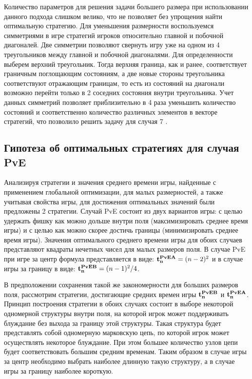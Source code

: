 Количество параметров для решения задачи большего размера при использовании данного подхода слишком велико, что не позволяет без упрощения найти оптимальную стратегию.
Для уменьшения размерности воспользуемся симметриями в игре стратегий игроков относительно главной и побочной диагоналей. 
Две симметрии позволяют свернуть игру уже на одном из 4 треугольников между главной и побочной диагоналями. 
Для определенности выберем верхний треугольник. Тогда верхняя граница, как и ранее, соответствует граничным поглощающим состояниям,
а две новые стороны треугольника соответствуют отражающим границам, то есть из состояний на диагонали возможно перейти только в 2 соседних состояния внутри треугольника.
Учет данных симметрий позволяет приблизительно в 4 раза уменьшить количество состояний и соответственно количество различных элементов в векторе стратегий,
что позволило решить задачу для случая 7 . 

\subsection{Гипотеза об оптимальных стратегиях для случая PvE}\label{subsec:ch3/sec1/sub1}

Анализируя стратегии и значения среднего времени игры, найденные с применением глобальной оптимизации, для малых размерностей,
а также учитывая свойства игры, для достижения оптимальных значений были предложены 2 стратегии.
Случай PvE состоит из двух вариантов игры: с целью удержать фишку как можно дольше внутри поля (максимизировать среднее время игры)
и с целью как можно скорее достичь границы (минимизировать среднее время игры). 
Значения оптимального среднего времени игры для обоих случаев представляют квадраты нечетных чисел для малых размеров поля.
В случае PvE при игре за центр формула представляется в виде: ${\bf t_n^{PvE A}} = (n-2)^2$ и в случае
игры за границу в виде: ${\bf t_n^{PvE B}} = (n-1)^2/4$.

В предположении сохранения такой же закономерности для больших размеров поля, рассмотрим стратегии, достигающие
средних времен игры ${\bf t_n^{PvE B}}$ и ${\bf t_n^{PvE A}}$. Принцип построения стратегии в обоих случаях 
состоит в выборе некоторой одномерной структуры внутри поля, на которой игрок может поддерживать блуждание без выхода за границу этой структуры.
Такая структура будет представлять собой одномерную марковскую цепь, по которой игрок может осуществлять некоторое блуждание.
При этом большее количество узлов цепи будет соответствовать большим средним временам. Таким образом в случае игры за центр
необходимо выбрать наиболее длинную такую структуру, а в случае игры за границу наиболее короткую.

